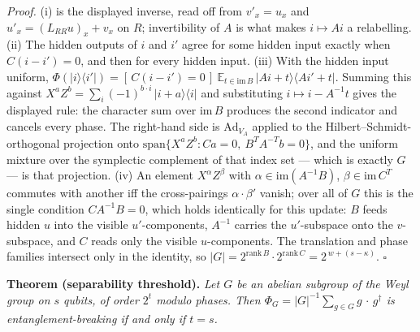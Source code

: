 \documentclass[
]{article}
\begin{document}
\emph{Proof.} (i) is the displayed inverse, read off from \(v'_x = u_x\)
and \(u'_x = (L_{RR}u)_x + v_x\) on \(R\); invertibility of \(A\) is
what makes \(i \mapsto Ai\) a relabelling. (ii) The hidden outputs of
\(i\) and \(i'\) agree for some hidden input exactly when
\(C(i-i') = 0\), and then for every hidden input. (iii) With the hidden
input uniform,
\(\Phi(|i\rangle\langle i'|) = [\,C(i-i')=0\,]\ \mathbb{E}_{t \in \mathrm{im}\,B}\, |Ai+t\rangle\langle Ai'+t|\).
Summing this against
\(X^{a}Z^{b} = \sum_i (-1)^{b\cdot i}\,|i+a\rangle\langle i|\) and
substituting \(i \mapsto i - A^{-1}t\) gives the displayed rule: the
character sum over \(\mathrm{im}\,B\) produces the second indicator and
cancels every phase. The right-hand side is \(\mathrm{Ad}_{V_A}\)
applied to the Hilbert--Schmidt-orthogonal projection onto
\(\mathrm{span}\{X^{a}Z^{b} : Ca = 0,\ B^{T}A^{-T}b = 0\}\), and the
uniform mixture over the symplectic complement of that index set ---
which is exactly \(G\) --- is that projection. (iv) An element
\(X^{\alpha}Z^{\beta}\) with \(\alpha \in \mathrm{im}(A^{-1}B)\),
\(\beta \in \mathrm{im}\,C^{T}\) commutes with another iff the
cross-pairings \(\alpha \cdot \beta'\) vanish; over all of \(G\) this is
the single condition \(C A^{-1} B = 0\), which holds identically for
this update: \(B\) feeds hidden \(u\) into the visible
\(u'\)-components, \(A^{-1}\) carries the \(u'\)-subspace onto the
\(v\)-subspace, and \(C\) reads only the visible \(u\)-components. The
translation and phase families intersect only in the identity, so
\(|G| = 2^{\mathrm{rank}\,B}\cdot 2^{\mathrm{rank}\,C} = 2^{\,w + (s-\kappa)}\).
\(\square\)

\textbf{Theorem (separability threshold).} \emph{Let \(G\) be an abelian
subgroup of the Weyl group on \(s\) qubits, of order \(2^{t}\) modulo
phases. Then \(\Phi_G = |G|^{-1}\sum_{g \in G} g\,\cdot\,g^{\dagger}\)
is entanglement-breaking if and only if \(t = s\).}
\end{document}
